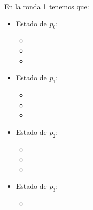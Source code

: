 En la ronda 1 tenemos que:

\begin{multicols}{2}
\begin{itemize}
\item Estado de $p_0$:
      \begin{itemize}
      \item {}
      
      \item {}
      
      \item {}
      \end{itemize}
      
\item Estado de $p_1$:
      \begin{itemize}
      \item {}
      
      \item {}
      
      \item {}
      \end{itemize}

\item Estado de $p_2$:
      \begin{itemize}
      \item {}
      
      \item {}
      
      \item {}
      \end{itemize}

\item Estado de $p_3$:
      \begin{itemize}
      \item {}
      

\end{itemize}
\end{itemize}
\end{multicols}
